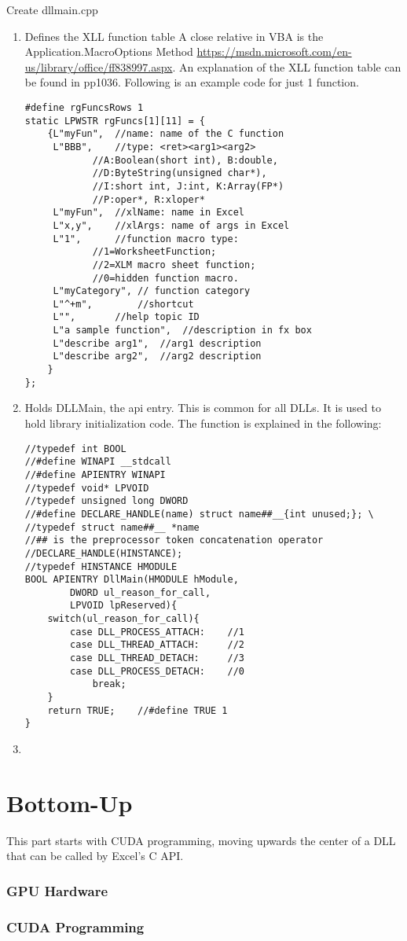 \documentclass{article}
\numberwithin{equation}{subsection}
\begin{document}
	Create dllmain.cpp\begin{enumerate}
		\item Defines the XLL function table \cite{BoveyWallentin2009ProfessionalExcelDevelopment-Th}
		A close relative in VBA is the Application.MacroOptions Method \url{https://msdn.microsoft.com/en-us/library/office/ff838997.aspx}. An explanation of the XLL function table can be found in \cite{BoveyWallentin2009ProfessionalExcelDevelopment-Th} pp1036. Following is an example code for just 1 function.
		\begin{lstlisting}
#define rgFuncsRows 1
static LPWSTR rgFuncs[1][11] = {
	{L"myFun",	//name: name of the C function 
	 L"BBB",	//type: <ret><arg1><arg2>
			//A:Boolean(short int), B:double, 
			//D:ByteString(unsigned char*), 
			//I:short int, J:int, K:Array(FP*)
			//P:oper*, R:xloper*
	 L"myFun",	//xlName: name in Excel
	 L"x,y",	//xlArgs: name of args in Excel
	 L"1",		//function macro type: 
			//1=WorksheetFunction; 
			//2=XLM macro sheet function;
			//0=hidden function macro.
	 L"myCategory",	// function category
	 L"^+m",		//shortcut
	 L"",		//help topic ID
	 L"a sample function",	//description in fx box
	 L"describe arg1",	//arg1 description
	 L"describe arg2",	//arg2 description
	}
};
		\end{lstlisting}
		
		\item Holds DLLMain, the api entry. This is common for all DLLs. It is used to hold library initialization code. The function is explained in the following:
		\begin{lstlisting}
//typedef int BOOL
//#define WINAPI __stdcall
//#define APIENTRY WINAPI
//typedef void* LPVOID
//typedef unsigned long DWORD
//#define DECLARE_HANDLE(name) struct name##__{int unused;}; \
//typedef struct name##__ *name  
//## is the preprocessor token concatenation operator
//DECLARE_HANDLE(HINSTANCE);
//typedef HINSTANCE HMODULE
BOOL APIENTRY DllMain(HMODULE hModule,
		DWORD ul_reason_for_call,
		LPVOID lpReserved){
	switch(ul_reason_for_call){
		case DLL_PROCESS_ATTACH:	//1
		case DLL_THREAD_ATTACH:		//2
		case DLL_THREAD_DETACH:		//3
		case DLL_PROCESS_DETACH:	//0
			break;
	}
	return TRUE;	//#define TRUE 1
}
		\end{lstlisting}
		\item 
	\end{enumerate}
	\part{Bottom-Up}
	This part starts with CUDA programming, moving upwards the center of a DLL that can be called by Excel's C API.
	\section{GPU Hardware}
	\section{CUDA Programming}
	
	
	
\end{document}
